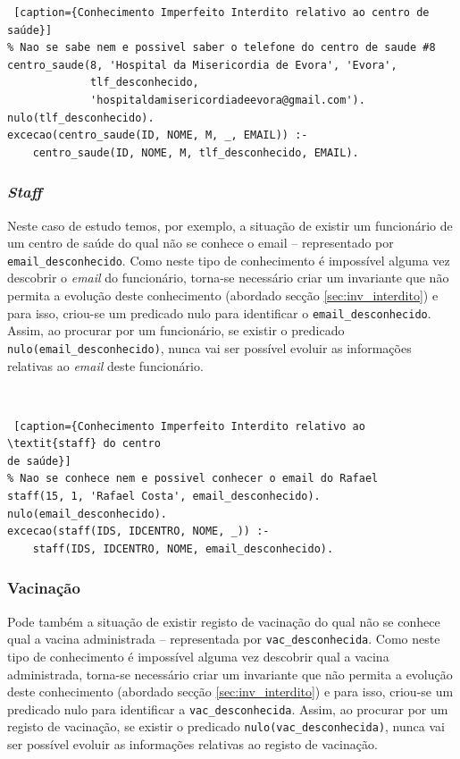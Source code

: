 \documentclass[a4paper, 11pt]{article}
\begin{document}
\pagebreak

\begin{lstlisting} [caption={Conhecimento Imperfeito Interdito relativo ao centro de saúde}]
% Nao se sabe nem e possivel saber o telefone do centro de saude #8
centro_saude(8, 'Hospital da Misericordia de Evora', 'Evora',
             tlf_desconhecido,
             'hospitaldamisericordiadeevora@gmail.com').
nulo(tlf_desconhecido).
excecao(centro_saude(ID, NOME, M, _, EMAIL)) :-
    centro_saude(ID, NOME, M, tlf_desconhecido, EMAIL).
\end{lstlisting}

\subsubsection*{\textit{Staff}}

Neste caso de estudo temos, por exemplo, a situação de existir um funcionário de um centro de 
saúde do qual não se conhece o email -- representado por \texttt{email\_desconhecido}. Como neste 
tipo de conhecimento
é impossível alguma vez descobrir o \textit{email} do funcionário, torna-se necessário criar um 
invariante que não permita a evolução deste conhecimento (abordado secção 
\ref{sec:inv_interdito}) e para isso, criou-se um predicado nulo para identificar o 
\texttt{email\_desconhecido}.
Assim, ao procurar por um funcionário, se existir o predicado \texttt{nulo(email\_desconhecido)}, 
nunca vai ser
possível evoluir as informações relativas ao \textit{email} deste funcionário.

\

\begin{lstlisting} [caption={Conhecimento Imperfeito Interdito relativo ao \textit{staff} do centro 
de saúde}]
% Nao se conhece nem e possivel conhecer o email do Rafael
staff(15, 1, 'Rafael Costa', email_desconhecido).
nulo(email_desconhecido).
excecao(staff(IDS, IDCENTRO, NOME, _)) :-
    staff(IDS, IDCENTRO, NOME, email_desconhecido).
\end{lstlisting}

\subsubsection*{Vacinação}

Pode também a situação de existir registo de vacinação do qual não se conhece qual a vacina 
administrada -- representada por \texttt{vac\_desconhecida}. Como neste tipo de conhecimento
é impossível alguma vez descobrir qual a vacina administrada, torna-se necessário criar um 
invariante que não permita a evolução deste conhecimento (abordado secção 
\ref{sec:inv_interdito}) e para isso, criou-se um predicado nulo para identificar a 
\texttt{vac\_desconhecida}.
Assim, ao procurar por um registo de vacinação, se existir o predicado 
\texttt{nulo(vac\_desconhecida)}, nunca vai ser
possível evoluir as informações relativas ao registo de vacinação.
\end{document}
